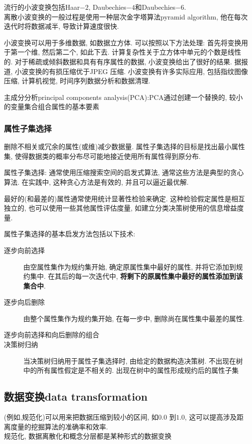 \documentclass{article}
\begin{document}
流行的小波变换包括Haar$-2$, Daubechies$-4$和Daubechies$-6$. \\
离散小波变换的一般过程是使用一种层次金字塔算法pyramid algorithm, 他在每次迭代时将数据减半, 导致计算速度很快.

小波变换可以用于多维数据, 如数据立方体. 可以按照以下方法处理: 首先将变换用于第一个维, 然后第二个, 如此下去. 计算复杂性关于立方体中单元的个数是线性的.
对于稀疏或倾斜数据和具有有序属性的数据, 小波变换给出了很好的结果. 据报道, 小波变换的有损压缩优于JPEG 压缩. 
小波变换有许多实际应用, 包括指纹图像压缩, 计算机视觉, 时间序列数据分析和数据清理.

主成分分析principal components analysis(PCA):PCA通过创建一个替换的, 较小的变量集合组合属性的基本要素

\subsubsection{属性子集选择}
删除不相关或冗余的属性(或维)减少数据量. 属性子集选择的目标是找出最小属性集, 使得数据类的概率分布尽可能地接近使用所有属性得到原分布.

属性子集选择: 通常使用压缩搜索空间的启发式算法, 通常这些方法是典型的贪心算法. 在实践中, 这种贪心方法是有效的, 并且可以逼近最优解.

最好的(和最差的)属性通常使用统计显著性检验来确定. 这种检验假定属性是相互独立的, 也可以使用一些其他属性评估度量, 如建立分类决策树使用的信息增益度量.

属性子集选择的基本启发方法包括以下技术:
\begin{description}
\item [逐步向前选择] 由空属性集作为规约集开始, 确定原属性集中最好的属性, 并将它添加到规约集中. 在其后的每一次迭代中, \textbf{将剩下的原属性集中最好的属性添加到该集合中}.
\item [逐步向后删除] 由整个属性集作为规约集开始, 在每一步中, 删除尚在属性集中最差的属性.
\item [逐步向前选择和向后删除的组合]
\item [决策树归纳] 当决策树归纳用于属性子集选择时, 由给定的数据构造决策树. 不出现在树中的所有属性假定是不相关的. 出现在树中的属性形成规约后的属性子集
\end{description}

\subsection{数据变换data transformation}
(例如,规范化)可以用来把数据压缩到较小的区间, 如$0.0$ 到$1.0$, 这可以提高涉及距离度量的挖掘算法的准确率和效率.\\
规范化, 数据离散化和概念分层都是某种形式的数据变换
\end{document}
